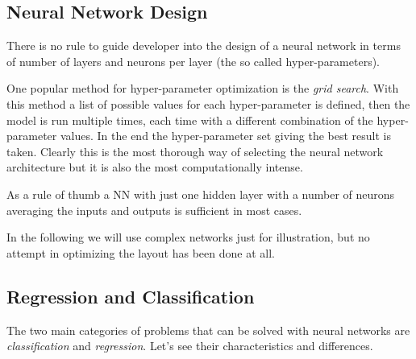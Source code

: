
\subsection{Neural Network Design}
\label{neural-network-design}

There is no rule to guide developer into the design of a neural network in terms of number of layers and neurons per layer (the so called hyper-parameters). 

One popular method for hyper-parameter optimization is  the \emph{grid search}. 
With this method a list of possible values for each hyper-parameter is defined, then the model is run multiple times, each time with a different combination of the hyper-parameter values. In the end the hyper-parameter set giving the best result is taken. Clearly this is the most thorough way of selecting the neural network architecture but it is also the most computationally intense.

As a rule of thumb a NN with just one hidden layer with a number of neurons averaging the inputs and outputs is sufficient in most cases.

In the following we will use complex networks just for illustration, but no attempt in optimizing the layout has been done at all.

\subsection{Regression and Classification}
\label{regression-and-classification}

The two main categories of problems that can be solved with neural networks are \emph{classification} and \emph{regression}. Let's see their characteristics and differences.

